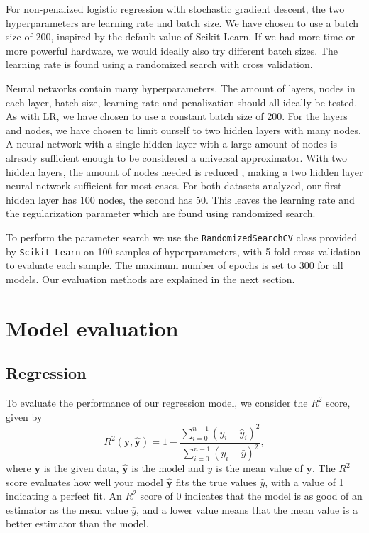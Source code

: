 \documentclass[a4paper, 11pt, twocolumn]{article}
\begin{document}
For non-penalized logistic regression with stochastic gradient descent,
the two hyperparameters are learning rate and batch size. We have chosen to use
a batch size of 200, inspired by the default value of Scikit-Learn. If we had
more time or more powerful hardware, we would ideally also try different batch sizes.
The learning rate is found using a randomized search with cross validation.

Neural networks contain many hyperparameters. The amount of layers, nodes in each
layer, batch size, learning rate and penalization should all ideally be tested.
As with LR, we have chosen to use a constant batch size of 200. For the layers
and nodes, we have chosen to limit ourself to two hidden layers with many nodes.
A neural network with a single hidden layer with a large amount of nodes is already
sufficient enough to be considered a universal approximator. With two hidden layers,
the amount of nodes needed is reduced \cite{ML_algo}, making a two hidden layer
neural network sufficient for most cases. For both datasets analyzed, our first
hidden layer has 100 nodes, the second has 50. This leaves the learning rate and
the regularization parameter which are found using randomized search.

To perform the parameter search we use the \texttt{RandomizedSearchCV} class provided
by \texttt{Scikit-Learn} \cite{sklearn_api} on 100 samples of hyperparameters,
with 5-fold cross validation to evaluate each sample. The maximum number of epochs
is set to 300 for all models. Our evaluation methods are explained in the next section.

\section{Model evaluation}
\subsection{Regression}
To evaluate the performance of our regression model, we consider the $R^2$ score,
given by
\begin{equation}
	R^2(\bm{y}, \bm{\hat{y}}) = 1 - \frac{\sum_{i=0}^{n - 1} (y_i -
	\hat{y}_i)^2}{\sum_{i=0}^{n - 1} (y_i - \bar{y})^2},
    \label{eq:R2}
\end{equation}
where $\bm{y}$ is the given data, $\bm{\hat{y}}$ is the model and ${\bar{y}}$ is
the mean value of $\bm{y}$. The $R^2$ score evaluates how well your model
$\bm{\hat{y}}$ fits the true values $\hat{y}$, with a value of 1 indicating a
perfect fit. An $R^2$ score of 0 indicates that the model is as good of an
estimator as the mean value ${\bar{y}}$, and a lower value means that the mean
value is a better estimator than the model.
\end{document}
